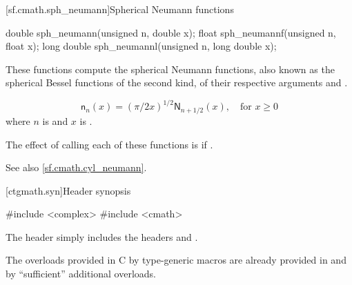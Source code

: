[sf.cmath.sph_neumann]{Spherical Neumann functions}%
%
%
%
%
%
%
\begin{itemdecl}
double       sph_neumann(unsigned n, double x);
float        sph_neumannf(unsigned n, float x);
long double  sph_neumannl(unsigned n, long double x);
\end{itemdecl}

\begin{itemdescr}

\pnum\effects
These functions compute the spherical Neumann functions,
also known as the spherical Bessel functions of the second kind,
of their respective arguments
 and .

\pnum\returns
\[%
  \mathsf{n}_n(x) =
  (\pi/2x)^{1\!/\!2} \mathsf{N}_{n + 1\!/\!2}(x),
	   \quad \mbox{for $x \ge 0$}
\]
where
$n$ is  and
$x$ is .

\pnum\remark
The effect of calling each of these functions
is 
if .

\pnum See also \ref{sf.cmath.cyl_neumann}.
\end{itemdescr}


[ctgmath.syn]{Header  synopsis}

%
\begin{codeblock}
#include <complex>
#include <cmath>
\end{codeblock}

\pnum
The header  simply includes the headers 
and .

\pnum
\begin{note} The overloads provided in C by type-generic macros are already
provided in  and  by ``sufficient'' additional
overloads.\end{note}
